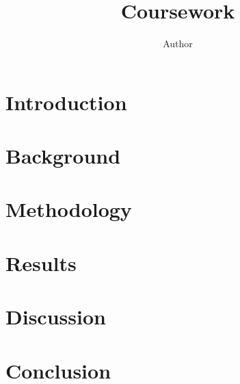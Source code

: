 \documentclass[coverpage]{inftechrep}
\begin{document}
\title{Coursework}
\author{Author}
\maketitle

\section{Introduction}

\section{Background}

\section{Methodology}

\section{Results}

\section{Discussion}

\section{Conclusion}
\end{document}
